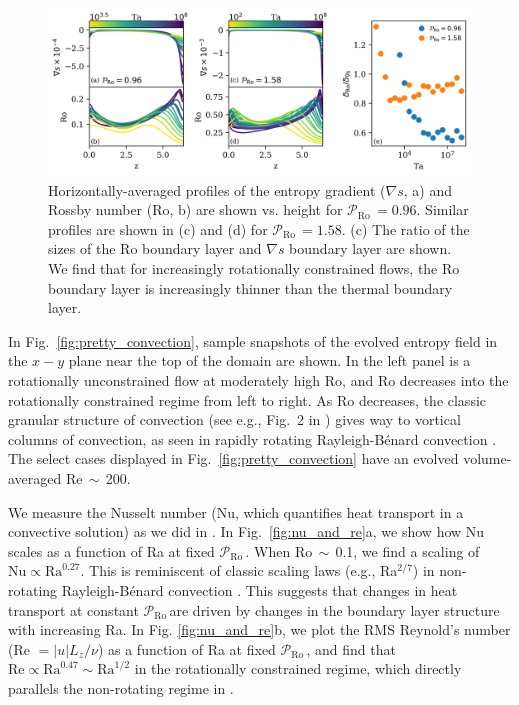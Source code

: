 \documentclass[twocolumn, amsmath, amsfonts, amssymb]{aastex62}
\newcommand{\grad}{\ensuremath{\nabla}}
\newcommand{\RB}{Rayleigh-B\'{e}nard }
\newcommand{\pro}{\ensuremath{\mathcal{P}_{\text{Ro}}\,}}
\begin{document}
\begin{figure}[ht!]
    \includegraphics[width=\textwidth]{./figs/boundary_layers.png}
    \caption{Horizontally-averaged profiles of the entropy gradient ($\grad s$, a)
    and Rossby number (Ro, b) are shown vs. height for $\pro = 0.96$. 
    Similar profiles are shown in (c) and (d) for $\pro = 1.58$. 
    (c) The ratio of the sizes of the Ro boundary layer and $\grad s$ boundary layer are
    shown. We find that for increasingly rotationally constrained flows, the Ro boundary layer
    is increasingly thinner than the thermal boundary layer.
    \label{fig:profiles_and_bls} }
\end{figure}

In Fig.~\ref{fig:pretty_convection}, sample snapshots
of the evolved entropy field in the $x-y$ plane near the top of the domain are shown. 
In the left panel is a rotationally unconstrained flow at moderately high
Ro, and Ro decreases into the rotationally constrained regime from left to right.
As Ro decreases, the
classic granular structure of convection (see e.g., Fig.~2 in \AB) gives way to vortical
columns of convection, as seen in rapidly rotating \RB convection \citep{stellmach&all2014}.
The select cases displayed in Fig.~\ref{fig:pretty_convection} have an evolved volume-averaged
Re$\,\sim\,$200.

We measure the Nusselt number (Nu, which quantifies heat transport in a convective
solution) as we did in \AB.
In Fig.~\ref{fig:nu_and_re}a, we show how Nu scales as a function
of Ra at fixed \pro. When Ro$\,\sim\,$0.1,
we find a scaling of $\text{Nu} \propto \text{Ra}^{0.27}$. This is reminiscent of
classic scaling laws (e.g., Ra$^{2/7}$) in non-rotating \RB convection \citep{ahlers&all2009}.
This suggests that changes in heat transport at constant \pro are driven by
changes in the boundary layer structure with increasing Ra.
In Fig. \ref{fig:nu_and_re}b, we plot the RMS Reynold's
number (Re $= |u| L_z / \nu$) as a function of Ra at fixed \pro, and find that 
$\text{Re} \propto \text{Ra}^{0.47} \sim \text{Ra}^{1/2}$ in the rotationally constrained regime,
which directly parallels the non-rotating regime in \AB.
\end{document}

